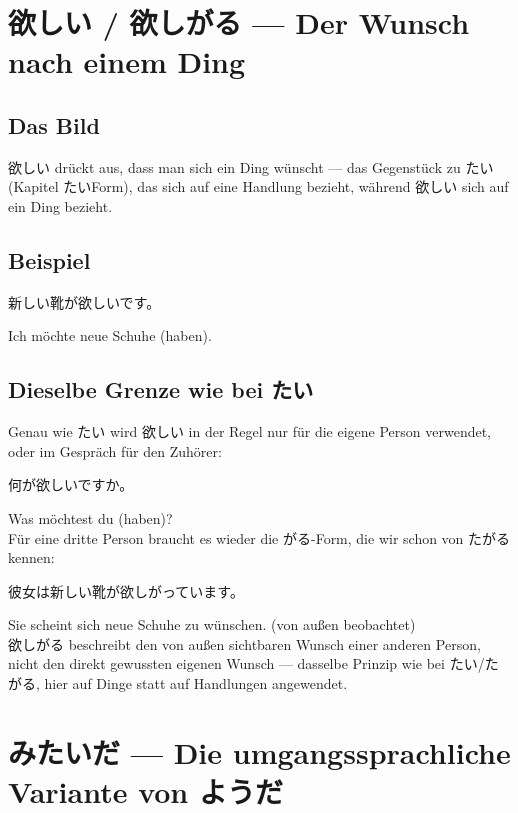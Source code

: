 \documentclass[12pt]{book}
\begin{document}
\chapter{欲しい / 欲しがる — Der Wunsch nach einem Ding}

\section*{Das Bild}

欲しい drückt aus, dass man sich ein Ding wünscht — das Gegenstück zu たい (Kapitel たいForm), das sich auf eine Handlung bezieht, während 欲しい sich auf ein Ding bezieht.

\section*{Beispiel}

\par\quad 新しい靴が欲しいです。\\
\par\quad Ich möchte neue Schuhe (haben).\\

\section*{Dieselbe Grenze wie bei たい}

Genau wie たい wird 欲しい in der Regel nur für die eigene Person verwendet, oder im Gespräch für den Zuhörer:

\par\quad 何が欲しいですか。\\
\par\quad Was möchtest du (haben)?\\

Für eine dritte Person braucht es wieder die がる-Form, die wir schon von たがる kennen:

\par\quad 彼女は新しい靴が欲しがっています。\\
\par\quad Sie scheint sich neue Schuhe zu wünschen. (von außen beobachtet)\\

欲しがる beschreibt den von außen sichtbaren Wunsch einer anderen Person, nicht den direkt gewussten eigenen Wunsch — dasselbe Prinzip wie bei たい/たがる, hier auf Dinge statt auf Handlungen angewendet.


\chapter{みたいだ — Die umgangssprachliche Variante von ようだ}
\end{document}
